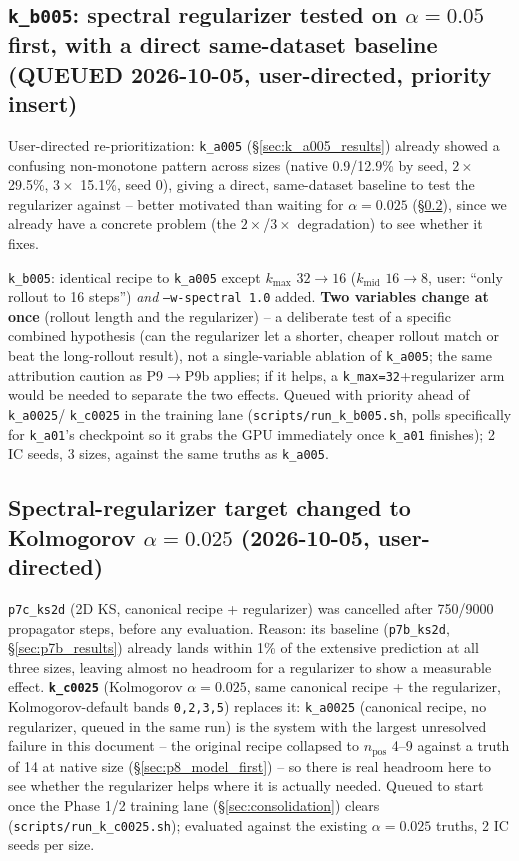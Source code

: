 \documentclass[11pt]{article}
\begin{document}
\subsection{\texttt{k\_b005}: spectral regularizer tested on $\alpha{=}0.05$
first, with a direct same-dataset baseline (QUEUED 2026-10-05, user-directed,
priority insert)}
\label{sec:k_b005_queued}

User-directed re-prioritization: \texttt{k\_a005}
(\S\ref{sec:k_a005_results}) already showed a confusing non-monotone
pattern across sizes (native 0.9/12.9\% by seed, $2\times$ 29.5\%,
$3\times$ 15.1\%, seed 0), giving a direct, same-dataset baseline to
test the regularizer against -- better motivated than waiting for
$\alpha{=}0.025$ (\S\ref{sec:spectral_redirect}), since we already have
a concrete problem (the $2\times$/$3\times$ degradation) to see whether
it fixes.

\texttt{k\_b005}: identical recipe to \texttt{k\_a005} except
$k_{\max}$ $32\to16$ ($k_{\mathrm{mid}}$ $16\to8$, user: ``only rollout
to 16 steps'') \emph{and} \texttt{--w-spectral 1.0} added. \textbf{Two
variables change at once} (rollout length and the regularizer) -- a
deliberate test of a specific combined hypothesis (can the regularizer
let a shorter, cheaper rollout match or beat the long-rollout result),
not a single-variable ablation of \texttt{k\_a005}; the same
attribution caution as P9$\to$P9b applies; if it helps, a
\texttt{k\_max{=}32}+regularizer arm would be needed to separate the
two effects. Queued with priority ahead of \texttt{k\_a0025}/
\texttt{k\_c0025} in the training lane
(\texttt{scripts/run\_k\_b005.sh}, polls specifically for
\texttt{k\_a01}'s checkpoint so it grabs the GPU immediately once
\texttt{k\_a01} finishes); 2 IC seeds, 3 sizes, against the same truths
as \texttt{k\_a005}.

\subsection{Spectral-regularizer target changed to Kolmogorov $\alpha{=}0.025$
(2026-10-05, user-directed)}
\label{sec:spectral_redirect}

\texttt{p7c\_ks2d} (2D KS, canonical recipe + regularizer) was cancelled
after 750/9000 propagator steps, before any evaluation. Reason: its
baseline (\texttt{p7b\_ks2d}, \S\ref{sec:p7b_results}) already lands
within 1\% of the extensive prediction at all three sizes, leaving
almost no headroom for a regularizer to show a measurable effect.
\textbf{\texttt{k\_c0025}} (Kolmogorov $\alpha{=}0.025$, same canonical
recipe + the regularizer, Kolmogorov-default bands \texttt{0,2,3,5})
replaces it: \texttt{k\_a0025} (canonical recipe, no regularizer,
queued in the same run) is the system with the largest unresolved
failure in this document -- the original recipe collapsed to
$n_{\mathrm{pos}}$ 4--9 against a truth of 14 at native size
(\S\ref{sec:p8_model_first}) -- so there is real headroom here to see
whether the regularizer helps where it is actually needed. Queued to
start once the Phase 1/2 training lane (\S\ref{sec:consolidation})
clears (\texttt{scripts/run\_k\_c0025.sh}); evaluated against the
existing $\alpha{=}0.025$ truths, 2 IC seeds per size.
\end{document}

